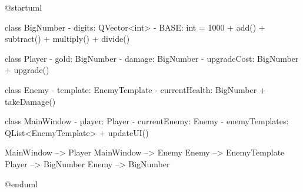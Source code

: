 @startuml

class BigNumber {
  - digits: QVector<int>
  - BASE: int = 1000
  + add()
  + subtract()
  + multiply()
  + divide()
}

class Player {
  - gold: BigNumber
  - damage: BigNumber
  - upgradeCost: BigNumber
  + upgrade()
}

class Enemy {
  - template: EnemyTemplate
  - currentHealth: BigNumber
  + takeDamage()
}

class MainWindow {
  - player: Player
  - currentEnemy: Enemy
  - enemyTemplates: QList<EnemyTemplate>
  + updateUI()
}

MainWindow --> Player
MainWindow --> Enemy
Enemy --> EnemyTemplate
Player --> BigNumber
Enemy --> BigNumber

@enduml
